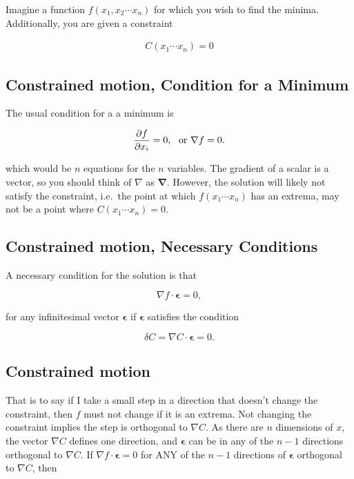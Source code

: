 \documentclass[%
oneside,                 %
final,                   %
10pt]{article}
\begin{document}
Imagine a function $f(x_1,x_2\cdots x_n)$ for which you wish to find
the minima. Additionally, you are given a constraint

\begin{eqnarray}
C(x_1\cdots x_n)=0
\end{eqnarray}

\subsection*{Constrained motion, Condition for a Minimum}

The usual condition for a a minimum is

\begin{eqnarray}
\frac{\partial f}{\partial x_i}=0{\rm ,~~or~}\nabla f=0.
\end{eqnarray}

which would be $n$ equations for the $n$ variables. The gradient of a
scalar is a vector, so you should think of $\nabla$ as
$\bm{\nabla}$. However, the solution will likely not satisfy the
constraint, i.e.~the point at which $f(x_1\cdots x_n)$ has an extrema,
may not be a point where $C(x_1\cdots x_n)=0$.

\subsection*{Constrained motion, Necessary Conditions}

A necessary condition for the solution is that

\begin{equation}
\nabla f\cdot\bm{\epsilon}=0,
\end{equation}

for any infinitesimal vector $\bm{\epsilon}$ if $\bm{\epsilon}$
satisfies the condition

\begin{equation}
\delta C=\nabla C\cdot\bm{\epsilon}=0.
\end{equation}

\subsection*{Constrained motion}

That is to say if I take a small step in a direction that doesn't
change the constraint, then $f$ must not change if it is an
extrema. Not changing the constraint implies the step is orthogonal to
$\nabla C$. As there are $n$ dimensions of $x$, the vector $\nabla C$
defines one direction, and $\bm{\epsilon}$ can be in any of the $n-1$
directions orthogonal to $\nabla C$. If $\nabla f\cdot\bm{\epsilon}=0$
for ANY of the $n-1$ directions of $\bm{\epsilon}$ orthogonal to
$\nabla C$, then
\end{document}

